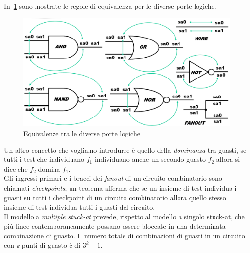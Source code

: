 In \figurename\,\ref{fig:equivaport} sono mostrate le regole di equivalenza per le diverse porte logiche.\\
\begin{figure}
\centering
\includegraphics[scale=0.3]{img/equivaport.png}
\caption{Equivalenze tra le diverse porte logiche}\label{fig:equivaport}
\end{figure}
Un altro concetto che vogliamo introdurre è quello della \emph{dominanza} tra guasti, se tutti i test che individuano $f_1$ individuano anche un secondo guasto $f_2$ allora si dice che $f_2$ domina $f_1$.\\
Gli ingressi primari e i bracci dei \emph{fanout} di un circuito combinatorio sono chiamati \emph{checkpoints}; un teorema afferma che se un insieme di test individua i guasti su tutti i checkpoint di un circuito combinatorio allora quello stesso insieme di test individua tutti i guasti del circuito.\\
Il modello a \emph{multiple stuck-at} prevede, rispetto al modello a singolo stuck-at, che più linee contemporaneamente possano essere bloccate in una determinata combinazione di guasto. Il numero totale di combinazioni di guasti in un circuito con \emph{k} punti di guasto è di $3^k-1$.
